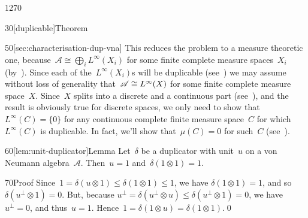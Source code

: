 \begin{parsec}{1270}
\begin{point}{30}[duplicable]{Theorem}
\begin{point}{50}[sec:characterisation-dup-vna]
This reduces the problem
to a measure theoretic one,
because~$\mathscr{A} \cong \bigoplus_i L^\infty(X_i)$
for some finite complete measure spaces~$X_i$
(by~).
Since each of the~$L^\infty(X_i)$s will be duplicable
(see~)
we may assume without loss of generality
that~$\mathscr{A}\cong L^\infty(X)$ for some finite complete measure space~$X$.
Since~$X$ splits into a discrete and a continuous
part (see~),
and the result is obviously true for discrete spaces,
we only need to show that~$L^\infty(C)=\{0\}$
for any continuous complete finite measure space~$C$
for which~$L^\infty(C)$ is duplicable.
In fact,
we'll show that~$\mu(C)=0$
for such~$C$
(see~).
\end{point}
\end{point}
\begin{point}{60}[lem:unit-duplicator]{Lemma}%
Let~$\delta$
be a duplicator 
with unit~$u$
on a von Neumann algebra~$\mathscr{A}$.
Then~$u=1$ and~$\delta(1\otimes 1)=1$.
\begin{point}{70}{Proof}%
Since~$1=\delta(u\otimes 1)\leq \delta(1\otimes 1) \leq 1$,
	we have $\delta(1\otimes 1)=1$, and so $\delta(u^\perp\otimes 1)=0$.
But,
because  $u^\perp = \delta(u^\perp \otimes u)
\leq \delta(u^\perp \otimes 1) = 0$,
we have~$u^\perp=0$, and thus~$u=1$.
Hence~$1=\delta(1\otimes u)=\delta(1\otimes 1)$.\qed
\end{point}
\end{point}
\end{parsec}
